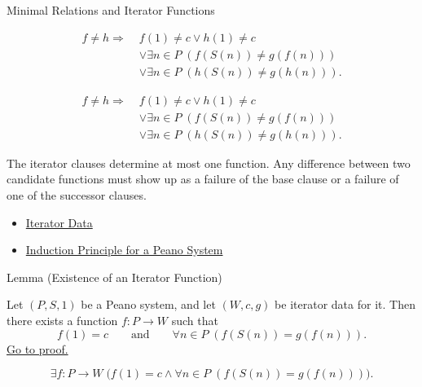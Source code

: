 \begin{topicbox}{Minimal Relations and Iterator Functions}
\begin{remark*}
\[
\begin{aligned}
f\neq h
\Longrightarrow\;&
f(1)\neq c\lor h(1)\neq c\\
&\lor \exists n\in P\;(f(S(n))\neq g(f(n)))\\
&\lor \exists n\in P\;(h(S(n))\neq g(h(n))).
\end{aligned}
\]
\end{remark*}

\begin{remark*}
\[
\begin{aligned}
f\neq h
\Longrightarrow\;&
f(1)\neq c\lor h(1)\neq c\\
&\lor \exists n\in P\;(f(S(n))\neq g(f(n)))\\
&\lor \exists n\in P\;(h(S(n))\neq g(h(n))).
\end{aligned}
\]
\end{remark*}

\begin{remark*}[Interpretation]
The iterator clauses determine at most one function. Any difference between
two candidate functions must show up as a failure of the base clause or a
failure of one of the successor clauses.
\end{remark*}

\begin{dependencies}
\begin{itemize}
  \item \hyperref[def:iterator-data-on-peano-system]{Iterator Data}
  \item \hyperref[thm:induction-principle-for-peano-system]{Induction Principle for a Peano System}
\end{itemize}
\end{dependencies}

\begin{lemmabox}{Lemma (Existence of an Iterator Function)}
\begin{lemma}
\label{lem:existence-of-iterator-function}
Let $(P,S,1)$ be a Peano system, and let $(W,c,g)$ be iterator data for it.
Then there exists a function $f:P\to W$ such that
\[
f(1)=c
\qquad\text{and}\qquad
\forall n\in P\;(f(S(n))=g(f(n))).
\]
\hyperref[prf:existence-of-iterator-function]{Go to proof.}
\end{lemma}
\end{lemmabox}

\begin{remark*}
\[
\exists f:P\to W\;
\bigl(f(1)=c\land \forall n\in P\;(f(S(n))=g(f(n)))\bigr).
\]
\end{remark*}


\end{topicbox}
